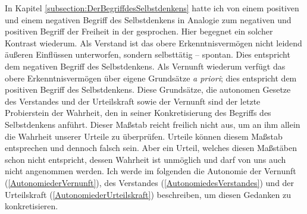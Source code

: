 In Kapitel \ref{subsection:DerBegriffdesSelbstdenkens} hatte ich von einem
positiven und einem negativen Begriff des Selbstdenkens in Analogie zum
negativen und positiven Begriff der Freiheit in der  gesprochen. Hier begegnet ein solcher Kontrast wiederum.
Als Verstand ist das obere Erkenntnisvermögen nicht leidend äußeren Einflüssen
unterworfen, sondern selbsttätig -- spontan. Dies entspricht dem negativen
Begriff des Selbstdenkens. Als Vernunft wiederum verfügt das obere
Erkenntnisvermögen über eigene Grundsätze \emph{a priori}; dies entspricht dem
positiven Begriff des Selbstdenkens. Diese Grundsätze, die autonomen Gesetze des
Verstandes und der Urteilskraft sowie der Vernunft sind der letzte Probierstein
der Wahrheit, den  in seiner Konkretisierung des Begriffs
des Selbstdenkens anführt. Dieser Maßstab reicht freilich nicht aus, um an ihm
allein die Wahrheit unserer Urteile zu überprüfen.
Urteile können diesem Maßstab entsprechen und dennoch falsch sein. Aber ein
Urteil, welches diesen Maßstäben schon nicht entspricht, dessen Wahrheit ist
unmöglich und darf von uns auch nicht angenommen werden. Ich werde im folgenden
die Autonomie der Vernunft (\ref{AutonomiederVernunft}), des Verstandes
(\ref{AutonomiedesVerstandes}) und der Urteilskraft
(\ref{AutonomiederUrteilskraft}) beschreiben, um diesen Gedanken zu
konkretisieren.
